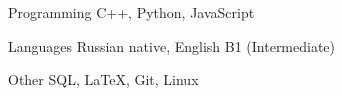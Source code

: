 

\begin{cvskills}

%


  \cvskill
    {Programming} %
    {C++, Python, JavaScript} %

  \cvskill
    {Languages} %
    {Russian native, English B1 (Intermediate)} %

\cvskill
    {Other} %
    {SQL, LaTeX, Git, Linux} %

\end{cvskills}
